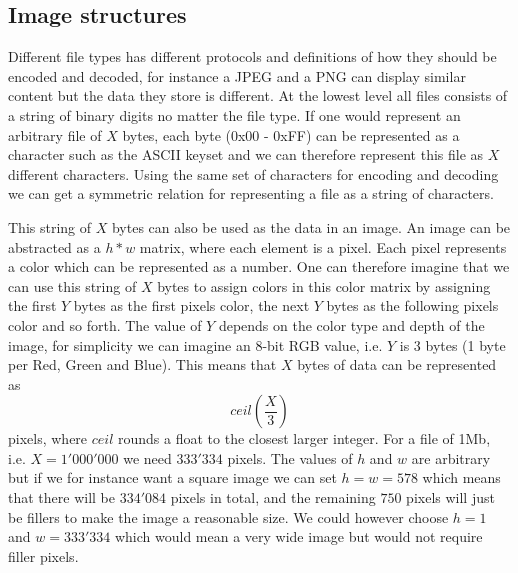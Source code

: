 \subsection{Image structures}
Different file types has different protocols and definitions of how they should be encoded and decoded, for instance a JPEG and a PNG can display similar content but the data they store is different. At the lowest level all files consists of a string of binary digits no matter the file type. If one would represent an arbitrary file of $X$ bytes, each byte (0x00 - 0xFF) can be represented as a character such as the ASCII keyset and we can therefore represent this file as $X$ different characters. Using the same set of characters for encoding and decoding we can get a symmetric relation for representing a file as a string of characters. 

This string of $X$ bytes can also be used as the data in an image. An image can be abstracted as a $h * w$ matrix, where each element is a pixel. Each pixel represents a color which can be represented as a number. One can therefore imagine that we can use this string of $X$ bytes to assign colors in this color matrix by assigning the first $Y$ bytes as the first pixels color, the next $Y$ bytes as the following pixels color and so forth. The value of $Y$ depends on the color type and depth of the image, for simplicity we can imagine an 8-bit RGB value, i.e. $Y$ is 3 bytes (1 byte per Red, Green and Blue). This means that $X$ bytes of data can be represented as 
$$ceil(\frac{X}{3})$$ 
pixels, where $ceil$ rounds a float to the closest larger integer. For a file of 1Mb, i.e. $X = 1'000'000$ we need $333'334$ pixels. The values of $h$ and $w$ are arbitrary but if we for instance want a square image we can set $ h = w = 578$ which means that there will be $334'084$ pixels in total, and the remaining $750$ pixels will just be fillers to make the image a reasonable size. We could however choose $h = 1$ and $w = 333'334$ which would mean a very wide image but would not require filler pixels.